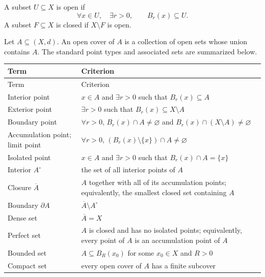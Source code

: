     \begin{definition}
        A subset $U\subseteq X$ is open if
        \[
            \forall x\in U,
            \quad
            \exists r>0,
            \qquad
            B_r(x)\subseteq U.
        \]
        A subset $F\subseteq X$ is closed if $X\setminus F$ is open.
    \end{definition}

    \begin{definition}
        Let $A\subseteq(X,d)$. An open cover of $A$ is a collection of open
        sets whose union contains $A$. The standard point types and associated
        sets are summarized below.

        {\small
        \renewcommand{\arraystretch}{1.16}
        \begin{longtable}{@{}L{0.22\textwidth}L{0.70\textwidth}@{}}
            \toprule
            Term & Criterion \\
            \midrule
            \endfirsthead

            \toprule
            Term & Criterion \\
            \midrule
            \endhead

            \bottomrule
            \endlastfoot

            Interior point & $x\in A$ and $\exists r>0$ such that $B_r(x)\subseteq A$ \\
            Exterior point & $\exists r>0$ such that $B_r(x)\subseteq X\setminus A$ \\
            Boundary point & $\forall r>0$, $B_r(x)\cap A\neq\varnothing$ and
                $B_r(x)\cap(X\setminus A)\neq\varnothing$ \\
            Accumulation point; limit point & $\forall r>0$,
                $(B_r(x)\setminus\{x\})\cap A\neq\varnothing$ \\
            Isolated point & $x\in A$ and $\exists r>0$ such that
                $B_r(x)\cap A=\{x\}$ \\
            Interior $A^\circ$ & the set of all interior points of $A$ \\
            Closure $\overline{A}$ & $A$ together with all of its accumulation points;
                equivalently, the smallest closed set containing $A$ \\
            Boundary $\partial A$ & $\overline{A}\setminus A^\circ$ \\
            Dense set & $\overline{A}=X$ \\
            Perfect set & $A$ is closed and has no isolated points; equivalently,
                every point of $A$ is an accumulation point of $A$ \\
            Bounded set & $A\subseteq B_R(x_0)$ for some $x_0\in X$ and $R>0$ \\
            Compact set & every open cover of $A$ has a finite subcover \\
        \end{longtable}
        }


\end{definition}
